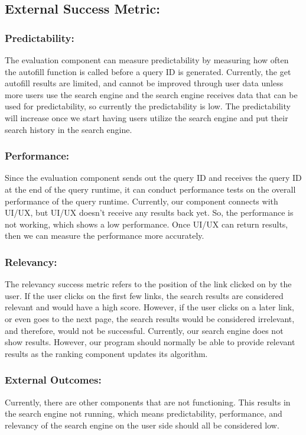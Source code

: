 \subsection*{External Success Metric:}

\subsubsection*{Predictability:}
The evaluation component can measure predictability by measuring how often the 
autofill function is called before a query ID is generated. Currently, the get 
autofill results are limited, and cannot be improved through user data unless 
more users use the search engine and the search engine receives data that can be 
used for predictability, so currently the predictability is low. The 
predictability will increase once we start having users utilize the search engine 
and put their search history in the search engine.

\subsubsection*{Performance:}
Since the evaluation component sends out the query ID and receives the query ID at 
the end of the query runtime, it can conduct performance tests on the overall 
performance of the query runtime. Currently, our component connects with UI/UX,  
but UI/UX doesn't receive any results back yet. So, the performance is not 
working, which shows a low performance. Once UI/UX can return results, then we can 
measure the performance more accurately.

\subsubsection*{Relevancy:}
The relevancy success metric refers to the position of the link clicked on by the 
user. If the user clicks on the first few links, the search results are 
considered relevant and would have a high score. However, if the user clicks on a 
later link, or even goes to the next page, the search results would be considered 
irrelevant,  and therefore, would not be successful. Currently, our search engine 
does not show results. However, our program should normally be able to provide 
relevant results as the ranking component updates its algorithm. 

\subsubsection*{External Outcomes:}
Currently, there are other components that are not functioning. This results in 
the search engine not running, which means predictability, performance, and 
relevancy of the search engine on the user side should all be considered low. 
